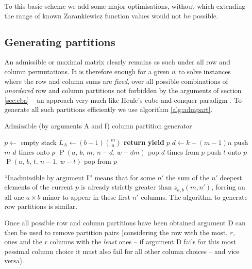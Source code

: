 \documentclass[10pt,a4paper]{article}
\theoremstyle{definition}
\begin{document}
	To this basic scheme we add some major optimisations, without which extending the range of known Zarankiewicz function values would not be possible.
	
	\subsection{Generating partitions}
	
	An admissible or maximal matrix clearly remains as such under all row and column permutations. It is therefore enough for a given $w$ to solve instances where the row and column sums are \textit{fixed}, over all possible combinations of \textit{unordered} row and column partitions not forbidden by the arguments of section \ref{sec:eba} -- an approach very much like Heule's cube-and-conquer paradigm \cite{cubeandconquer}. To generate all such partitions efficiently we use algorithm \ref{alg:admpart}.
	
	\begin{algorithm}
		\caption{Admissible (by arguments A and I) column partition generator}\label{alg:admpart}
		\begin{algorithmic}
			\State $p\gets$ empty stack 
			\State $L_A\gets(b-1)\binom ma$ 
			\State \textbf{return}
			\State \textbf{yield} $p$
			 
			\State $d\gets k-(m-1)n$
			\State push $m$ $d$ times onto $p$
			\State $\operatorname{P}(a,\,b,\,m,\,n-d,\,w-dm)$
			\State pop $d$ times from $p$
			\Else
			 
			\State push $t$ onto $p$
			\State $\operatorname{P}(a,\,b,\,t,\,n-1,\,w-t)$
			\State pop from $p$
			\EndFor
			\EndIf
			\EndProcedure
		\end{algorithmic}
	\end{algorithm}
	
	``Inadmissible by argument I'' means that for some $n'$ the sum of the $n'$ deepest elements of the current $p$ is already strictly greater than $z_{a,b}(m,n')$, forcing an all-one $a\times b$ minor to appear in these first $n'$ columns. The algorithm to generate row partitions is similar.
	
	Once all possible row and column partitions have been obtained argument D can then be used to remove partition pairs (considering the row with the most, $r$, ones and the $r$ columns with the \textit{least} ones -- if argument D fails for this most pessimal column choice it must also fail for all other column choices -- and vice versa).
	
\end{document}
